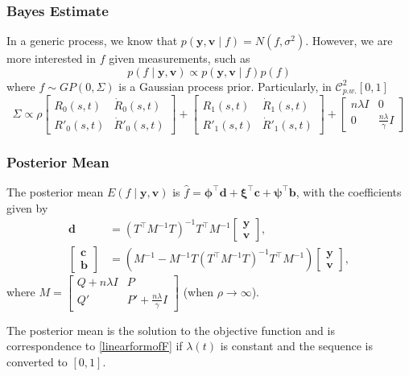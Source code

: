 \documentclass{beamer}
\begin{document}
\begin{frame}
\frametitle{Bayes Estimate}


In a generic process, we know that $p(\mathbf{y},\mathbf{v}\mid f) = N(f,\sigma^2)$. However, we are more interested in $f$ given measurements, such as 
\begin{equation}
p(f\mid \mathbf{y},\mathbf{v}) \propto p(\mathbf{y},\mathbf{v}\mid f)p(f)
\end{equation}
where $f\sim GP(0,\Sigma)$ is a Gaussian process prior. Particularly, in $\mathcal{C}_{p.w.}^{2}[0,1]$ 
\begin{equation}
\Sigma\propto  \rho\begin{bmatrix}
R_0(s,t) & \dot{R}_0(s,t)\\R'_0(s,t) &\dot{R}'_0(s,t) \end{bmatrix} + \begin{bmatrix}
R_1(s,t) & \dot{R}_1(s,t)\\R'_1(s,t) &\dot{R}'_1(s,t) \end{bmatrix} + \begin{bmatrix}
n\lambda I & 0 \\ 0 &\frac{n\lambda}{\gamma} I \end{bmatrix}
\end{equation}

\end{frame}



\begin{frame}
\frametitle{Posterior Mean}


The posterior mean $E(f \mid \mathbf{y},\mathbf{v})$ is $\hat{f}  = \mathbf{\phi}^\top \mathbf{d}+\mathbf{\xi}^\top \mathbf{c}+\mathbf{\psi}^\top \mathbf{b}$, with the coefficients given by
\begin{align} 
\mathbf{d}&=\left(T^\top M^{-1}T\right)^{-1}T^\top M^{-1}\begin{bmatrix}\mathbf{y} \\ \mathbf{v} \end{bmatrix},\\
\begin{bmatrix}\mathbf{c}\\ \mathbf{b}\end{bmatrix} &=
\left(M^{-1}-M^{-1}T\left(T^\top M^{-1} T\right)^{-1}T^\top M^{-1}\right)\begin{bmatrix}\mathbf{y}\\ \mathbf{v} \end{bmatrix},
\end{align} 
where $M=\begin{bmatrix} Q+n\lambda I& P\\ Q'& P'+\frac{n\lambda}{\gamma}I \end{bmatrix}$ (when $\rho\rightarrow \infty$).

The posterior mean is the solution to the objective function and is correspondence to \eqref{linearformofF} if $\lambda(t)$ is constant and the sequence is converted to $[0,1]$. 

\end{frame}
\end{document}
